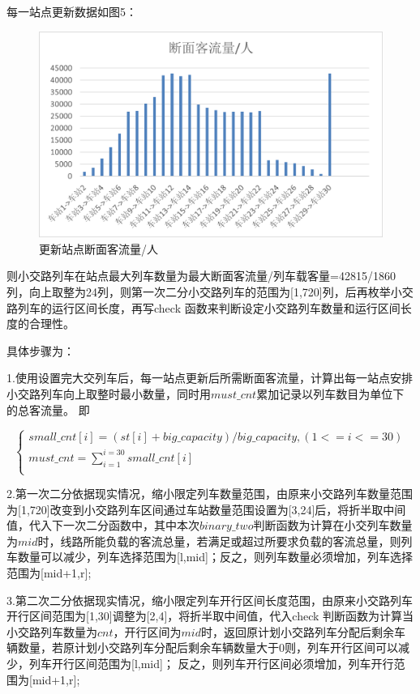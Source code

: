 \documentclass[UTF8]{ctexart}
\begin{document}
每一站点更新数据如图5：\par
\begin{figure}[h]
	\centering
	\includegraphics[scale=0.6]{更新站点断面客流量.png}
	\caption{更新站点断面客流量/人}
\end{figure}
则小交路列车在站点最大列车数量为最大断面客流量/列车载客量=42815/1860列，向上取整为24列，则第一次二分小交路列车的范围为[1,720]列，后再枚举小交路列车的运行区间长度，再写check 函数来判断设定小交路列车数量和运行区间长度的合理性。\par
具体步骤为：\par
1.使用设置完大交列车后，每一站点更新后所需断面客流量，计算出每一站点安排小交路列车向上取整时最小数量，同时用$must\_cnt$累加记录以列车数目为单位下的总客流量。
即\par
$$
\left\{ \begin{array}{c}
	small\_cnt\left[ i \right] =\left( st\left[ i \right] +big\_capacity \right) /big\_capacity,\left( 1<=i<=30 \right)\\
	must\_cnt=\sum_{i=1}^{i=30}{small\_cnt\left[ i \right]}\\
\end{array} \right. 
$$\par
2.第一次二分依据现实情况，缩小限定列车数量范围，由原来小交路列车数量范围为[1,720]改变到小交路列车区间通过车站数量范围设置为[3,24]后，将折半取中间值，代入下一次二分函数中，其中本次$binary\_two$判断函数为计算在小交列车数量为$mid$时，线路所能负载的客流总量，若满足或超过所要求负载的客流总量，则列车数量可以减少，列车选择范围为[l,mid]；反之，则列车数量必须增加，列车选择范围为[mid+1,r];\par
3.第二次二分依据现实情况，缩小限定列车开行区间长度范围，由原来小交路列车开行区间范围为[1,30]调整为[2,4]，将折半取中间值，代入check 判断函数为计算当小交路列车数量为$cnt$，开行区间为$mid$时，返回原计划小交路列车分配后剩余车辆数量，若原计划小交路列车分配后剩余车辆数量大于0则，列车开行区间可以减少，列车开行区间范围为[l,mid]； 反之，则列车开行区间必须增加，列车开行范围为[mid+1,r];\par
\end{document}
